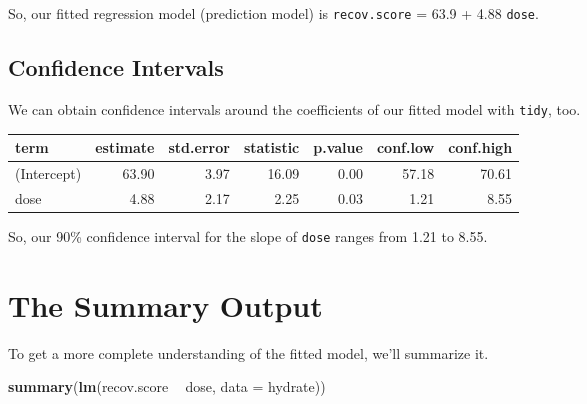 \documentclass[
]{book}
\newenvironment{Shaded}{\begin{snugshade}}{\end{snugshade}}
\newcommand{\DataTypeTok}[1]{\textcolor[rgb]{0.13,0.29,0.53}{#1}}
\newcommand{\DecValTok}[1]{\textcolor[rgb]{0.00,0.00,0.81}{#1}}
\newcommand{\FloatTok}[1]{\textcolor[rgb]{0.00,0.00,0.81}{#1}}
\newcommand{\KeywordTok}[1]{\textcolor[rgb]{0.13,0.29,0.53}{\textbf{#1}}}
\newcommand{\NormalTok}[1]{#1}
\newcommand{\OperatorTok}[1]{\textcolor[rgb]{0.81,0.36,0.00}{\textbf{#1}}}
\newcommand{\OtherTok}[1]{\textcolor[rgb]{0.56,0.35,0.01}{#1}}
\newcommand{\StringTok}[1]{\textcolor[rgb]{0.31,0.60,0.02}{#1}}
\begin{document}
So, our fitted regression model (prediction model) is \texttt{recov.score} = 63.9 + 4.88 \texttt{dose}.

\hypertarget{confidence-intervals}{%
\subsection{Confidence Intervals}\label{confidence-intervals}}

We can obtain confidence intervals around the coefficients of our fitted model with \texttt{tidy}, too.

\begin{Shaded}
\end{Shaded}

\begin{tabular}{l|r|r|r|r|r|r}
\hline
term & estimate & std.error & statistic & p.value & conf.low & conf.high\\
\hline
(Intercept) & 63.90 & 3.97 & 16.09 & 0.00 & 57.18 & 70.61\\
\hline
dose & 4.88 & 2.17 & 2.25 & 0.03 & 1.21 & 8.55\\
\hline
\end{tabular}

So, our 90\% confidence interval for the slope of \texttt{dose} ranges from 1.21 to 8.55.

\hypertarget{the-summary-output}{%
\section{The Summary Output}\label{the-summary-output}}

To get a more complete understanding of the fitted model, we'll summarize it.

\begin{Shaded}
\begin{Highlighting}[]
\KeywordTok{summary}\NormalTok{(}\KeywordTok{lm}\NormalTok{(recov.score }\OperatorTok{~}\StringTok{ }\NormalTok{dose, }\DataTypeTok{data =}\NormalTok{ hydrate))}
\end{Highlighting}
\end{Shaded}
\end{document}
